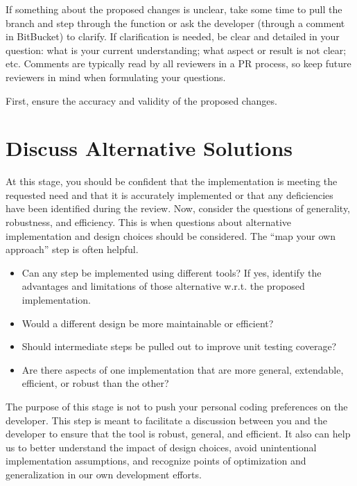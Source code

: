\documentclass[
]{book}
\providecommand{\tightlist}{%
  \setlength{\itemsep}{0pt}\setlength{\parskip}{0pt}}
\begin{document}
If something about the proposed changes is unclear, take some time to pull the branch and step through the function or ask the developer (through a comment in BitBucket) to clarify. If clarification is needed, be clear and detailed in your question: what is your current understanding; what aspect or result is not clear; etc. Comments are typically read by all reviewers in a PR process, so keep future reviewers in mind when formulating your questions.

First, ensure the accuracy and validity of the proposed changes.

\hypertarget{discuss-alternative-solutions}{%
\section{Discuss Alternative Solutions}\label{discuss-alternative-solutions}}

At this stage, you should be confident that the implementation is meeting the requested need and that it is accurately implemented or that any deficiencies have been identified during the review. Now, consider the questions of generality, robustness, and efficiency. This is when questions about alternative implementation and design choices should be considered. The ``map your own approach'' step is often helpful.

\begin{itemize}
\tightlist
\item
  Can any step be implemented using different tools? If yes, identify the advantages and limitations of those alternative w.r.t. the proposed implementation.
\item
  Would a different design be more maintainable or efficient?
\item
  Should intermediate steps be pulled out to improve unit testing coverage?
\item
  Are there aspects of one implementation that are more general, extendable, efficient, or robust than the other?
\end{itemize}

The purpose of this stage is not to push your personal coding preferences on the developer. This step is meant to facilitate a discussion between you and the developer to ensure that the tool is robust, general, and efficient. It also can help us to better understand the impact of design choices, avoid unintentional implementation assumptions, and recognize points of optimization and generalization in our own development efforts.
\end{document}
